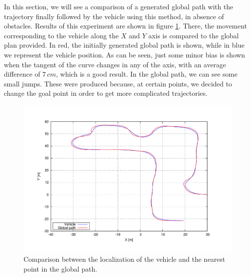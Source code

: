 In this section, we will see a comparison of a generated global path with the trajectory finally followed by the vehicle using this method, in absence of obstacles. Results of this experiment are shown in figure \ref{fig:cp07_localization_diff}.
% 
% 
There, the movement corresponding to the vehicle along the $X$ and $Y$ axis is compared to the global plan provided. In red, the initially generated global path is shown, while in blue we represent the vehicle position. As can be seen, just some minor bias is shown when the tangent of the curve changes in any of the axis, with an average difference of $7\,cm$, which is a good result. In the global path, we can see some small jumps. These were produced because, at certain points, we decided to change the goal point in order to get more complicated trajectories.

\begin{figure}[h!]
  \centering
  \includegraphics[width=\textwidth,height=0.5\textwidth,trim=50 50 90 60, clip]{differences}
  \caption{Comparison between the localization of the vehicle and the nearest point in the global path.}\label{fig:cp07_localization_diff}
\end{figure}

